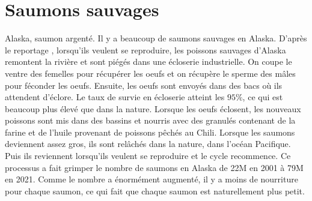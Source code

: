 \documentclass{article}
\begin{document}
\section{Saumons sauvages}
Alaska, saumon argenté. Il y a beaucoup de saumons sauvages en Alaska.
D'après le reportage \cite{FT1}, lorsqu'ils veulent se reproduire, les poissons sauvages d'Alaska remontent la rivière et sont piégés dans une écloserie industrielle. On coupe le ventre des femelles pour récupérer les oeufs et on récupère le sperme des mâles pour féconder les oeufs. Ensuite, les oeufs sont envoyés dans des bacs
où ils attendent d'éclore. Le taux de survie en écloserie atteint les $95\%$, ce qui est beaucoup plus élevé que dans la nature. Lorsque les oeufs éclosent, les nouveaux poissons sont mis dans des bassins et nourris avec des granulés contenant de la farine et de l'huile provenant de poissons pêchés au Chili.
Lorsque les saumons deviennent assez gros, ils sont relâchés dans la nature, dans l'océan Pacifique. Puis ils reviennent lorsqu'ils veulent se reproduire et le cycle recommence. Ce processus a fait grimper le nombre de saumons en Alaska de 22M en 2001 à 79M en 2021. Comme le nombre a énormément augmenté, il y a moins de nourriture pour chaque saumon, ce qui fait que chaque saumon est naturellement plus petit.

\printbibliography
\end{document}
